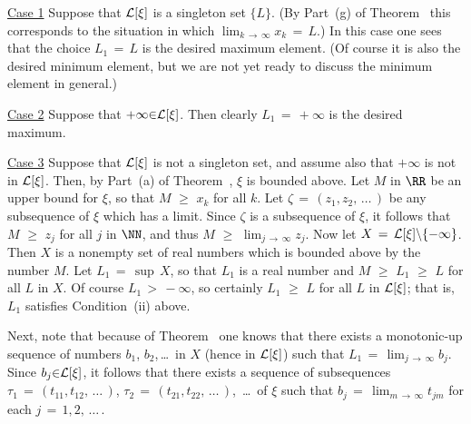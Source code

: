 \V

        \underline{Case 1} Suppose that ${\cal L}[{\xi}]$ is a singleton set $\{L\}$.
    (By Part~(g) of Theorem~ this corresponds to the situation in which $\lim_{k \,{\rightarrow}\, {\infty}} x_{k} \,=\, L$.)
    In this case one sees that the choice $L_{1} \,=\, L$ is the desired maximum element.
    (Of course it is also the desired minimum element, but we are not yet ready to discuss the minimum element in general.)

\V

        \underline{Case 2} Suppose that $+{\infty}{\in}{\cal L}[{\xi}]$.
    Then clearly $L_{1} \,=\, +{\infty}$ is the desired maximum.

\V

        \underline{Case 3} Suppose that ${\cal L}[{\xi}]$ is not a singleton set, and assume also that $+{\infty}$ is not in ${\cal L}[{\xi}]$.
    Then, by Part~(a) of Theorem~, ${\xi}$ is bounded above.
    Let $M$ in ${\RR}$ be an upper bound for ${\xi}$, so that $M\,\,{\geq}\,\,x_{k}$ for all $k$.
    Let ${\zeta} \,=\, (z_{1},z_{2},\,{\ldots}\,)$ be any subsequence of ${\xi}$ which has a limit.
    Since ${\zeta}$ is a subsequence of ${\xi}$, it follows that $M\,\,{\geq}\,\,z_{j}$ for all $j$ in ${\NN}$, and thus $M\,\,{\geq}\,\,\lim_{j \,{\rightarrow}\, {\infty}} z_{j}$.
    Now let $X \,=\, {\cal L}[{\xi}]{\setminus}\{-{\infty}\}$.
    Then $X$ is a nonempty set of real numbers which is bounded above by the number $M$.
    Let $L_{1} \,=\, {\sup}\,X$, so that $L_{1}$ is a real number and $M\,\,{\geq}\,\,L_{1}\,\,{\geq}\,\,L$ for all $L$ in $X$.
    Of course $L_{1}\,>\,-{\infty}$, so certainly $L_{1}\,\,{\geq}\,\,L$ for all $L$ in ${\cal L}[{\xi}]$; that is, $L_{1}$ satisfies Condition~(ii) above.

    Next, note that because of Theorem~ one knows that there exists a monotonic-up sequence of numbers $b_{1}$, $b_{2}$,\,{\ldots}\, in $X$
    (hence in ${\cal L}[{\xi}]$) such that $L_{1} \,=\, \lim_{j \,{\rightarrow}\, {\infty}} b_{j}$.
    Since $b_{j}{\in}{\cal L}[{\xi}]$, it follows that there exists a sequence of subsequences ${\tau}_{1} \,=\, (t_{11},t_{12},\,{\ldots}\,)$, ${\tau}_{2} \,=\, (t_{21},t_{22},\,{\ldots}\,)$, \,{\ldots}\, of ${\xi}$ such that $b_{j} \,=\, \lim_{m \,{\rightarrow}\, {\infty}} t_{jm}$ for each $j \,=\, 1,2,\,{\ldots}\,$.

